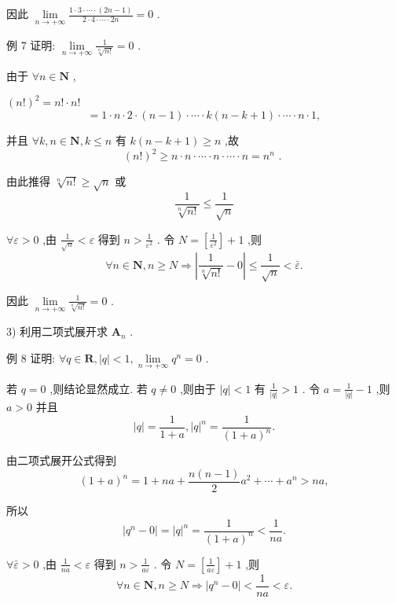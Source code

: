 因此 $\mathop{\lim }\limits_{{n \rightarrow   + \infty }}\frac{1 \cdot  3 \cdot  \cdots  \cdot  \left( {{2n} - 1}\right) }{2 \cdot  4 \cdot  \cdots  \cdot  {2n}} = 0$ .

例 7 证明: $\mathop{\lim }\limits_{{n \rightarrow   + \infty }}\frac{1}{\sqrt[n]{n!}} = 0$ .

由于 $\forall n \in  \mathbf{N}$ ,

${\left( n!\right) }^{2} = n! \cdot  n!$
$$= 1 \cdot  n \cdot  2 \cdot  \left( {n - 1}\right)  \cdot  \cdots  \cdot  k\left( {n - k + 1}\right)  \cdot  \cdots  \cdot  n \cdot  1,$$

并且 $\forall k,n \in  \mathbf{N},k \leq  n$ 有 $k\left( {n - k + 1}\right)  \geq  n$ ,故
$${\left( n!\right) }^{2} \geq  n \cdot  n \cdot  \cdots  \cdot  n \cdot  \cdots  \cdot  n = {n}^{n}\text{ . }$$

由此推得 $\sqrt[n]{n!} \geq  \sqrt{n}$ 或
$$\frac{1}{\sqrt[n]{n!}} \leq  \frac{1}{\sqrt{n}}$$

$\forall \varepsilon  > 0$ ,由 $\frac{1}{\sqrt{n}} < \varepsilon$ 得到 $n > \frac{1}{{\varepsilon }^{2}}$ . 令 $N = \left\lbrack  \frac{1}{{\varepsilon }^{2}}\right\rbrack   + 1$ ,则
$$\forall n \in  \mathbf{N},n \geq  N \Rightarrow  \left| {\frac{1}{\sqrt[n]{n!}} - 0}\right|  \leq  \frac{1}{\sqrt{n}} < \bar{\varepsilon }.$$

因此 $\mathop{\lim }\limits_{{n \rightarrow   + \infty }}\frac{1}{\sqrt[n]{n!}} = 0$ .

3) 利用二项式展开求 ${\mathbf{A}}_{n}$ .

例 8 证明: $\forall q \in  \mathbf{R},\left| q\right|  < 1,\mathop{\lim }\limits_{{n \rightarrow   + \infty }}{q}^{n} = 0$ .

若 $q = 0$ ,则结论显然成立. 若 $q \neq  0$ ,则由于 $\left| q\right|  < 1$ 有 $\frac{1}{\left| q\right| } > 1$ . 令 $a = \frac{1}{\left| q\right| } - 1$ ,则 $a > 0$ 并且
$$\left| q\right|  = \frac{1}{1 + a},{\left| q\right| }^{n} = \frac{1}{{\left( 1 + a\right) }^{n}}.$$

由二项式展开公式得到
$${\left( 1 + a\right) }^{n} = 1 + {na} + \frac{n\left( {n - 1}\right) }{2}{a}^{2} + \cdots  + {a}^{n} > {na},$$

所以
$$\left| {{q}^{n} - 0}\right|  = {\left| q\right| }^{n} = \frac{1}{{\left( 1 + a\right) }^{n}} < \frac{1}{na}.$$

$\forall \bar{\varepsilon } > 0$ ,由 $\frac{1}{na} < \varepsilon$ 得到 $n > \frac{1}{a\varepsilon }$ . 令 $N = \left\lbrack  \frac{1}{a\varepsilon }\right\rbrack   + 1$ ,则
$$\forall n \in  \mathbf{N},n \geq  N \Rightarrow  \left| {{q}^{n} - 0}\right|  < \frac{1}{na} < \varepsilon .$$

